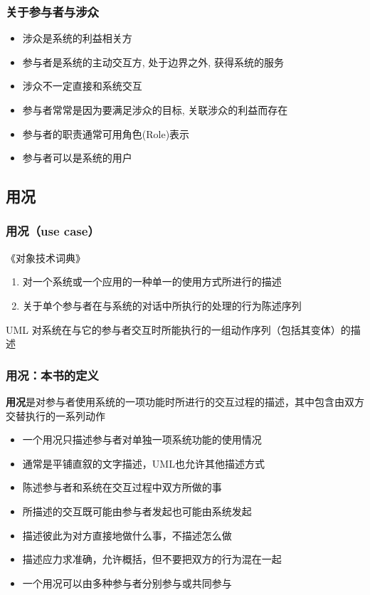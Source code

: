 \documentclass[compress]{beamer}
\begin{document}
\begin{frame}
    \frametitle{关于参与者与涉众}
    \begin{itemize}
        \item 涉众是系统的利益相关方
        \item 参与者是系统的主动交互方, 处于边界之外, 获得系统的服务
        \item 涉众不一定直接和系统交互
        \item 参与者常常是因为要满足涉众的目标, 关联涉众的利益而存在
        \item 参与者的职责通常可用角色(Role)表示
        \item 参与者可以是系统的用户
    \end{itemize}
\end{frame}

\subsection{用况}

\begin{frame}
  \frametitle{用况（use case）}
  \begin{block}{《对象技术词典》}
    \begin{enumerate}
      \item 对一个系统或一个应用的一种单一的使用方式所进行的描述
      \item 关于单个参与者在与系统的对话中所执行的处理的行为陈述序列
  \end{enumerate}
  \end{block}
  \begin{block}{ UML }
      对系统在与它的参与者交互时所能执行的一组动作序列（包括其变体）的描
      述
    \end{block}

\end{frame}

\begin{frame}
  \frametitle{用况：本书的定义}
  \begin{definition}
  \textbf{用况}是对参与者使用系统的一项功能时所进行的交互过程的描述，其中包含由双方
交替执行的一系列动作
\end{definition}
\begin{itemize}
  \item 一个用况只描述参与者对\alert{单独一项}系统功能的使用情况
  \item 通常是平铺直叙的\alert{文字}描述，UML也允许其他描述方式
  \item 陈述参与者和系统在交互过程中\alert{双方}所做的事
  \item 所描述的交互既可能由\alert{参与者发起}也可能由\alert{系统发起}
  \item 描述彼此为对方\alert{直接地}做什么事，不描述怎么做
  \item 描述应力求准确，允许概括，但\alert{不要把双方的行为混在一起}
  \item 一个用况可以由\alert{多种参与者}分别参与或共同参与
\end{itemize}
\end{frame}
\end{document}
